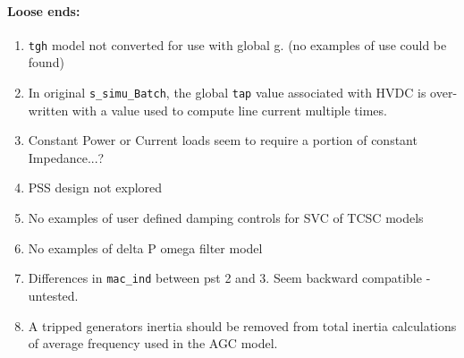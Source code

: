 \documentclass[12pt]{article}
\begin{document}
\begin{multicols}{2}
\paragraph{Loose ends:} %
	\begin{enumerate}
		\item \verb|tgh| model not converted for use with global g. (no examples of use could be found)
		\item In original \verb|s_simu_Batch|, the global \verb|tap| value associated with HVDC is over-written with  a value used to compute line current multiple times.
		\item Constant Power or Current loads seem to require a portion of constant Impedance...?
		\item PSS design not explored
		\item No examples of user defined damping controls for SVC of TCSC models
		\item No examples of delta P omega filter model
		\item Differences in \verb|mac_ind| between pst 2 and 3. Seem backward compatible - untested.
		\item A tripped generators inertia should be removed from total inertia calculations of average frequency used in the AGC model.
	\end{enumerate}
\vfill\null
\columnbreak


\vfill\null
\end{multicols}
\end{document}
